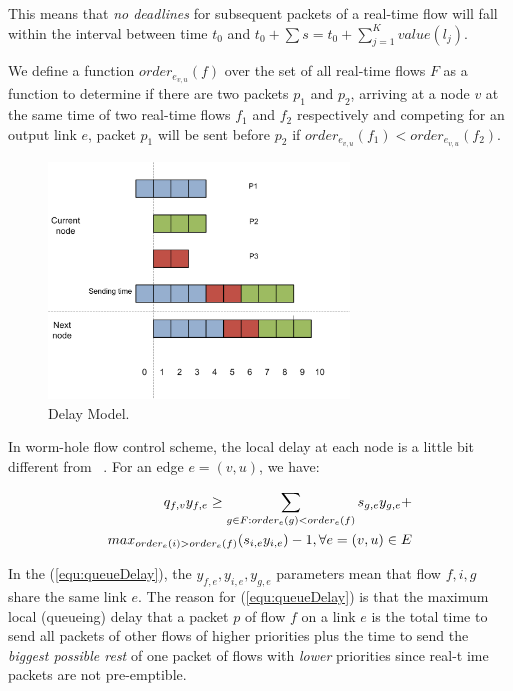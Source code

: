 \documentclass[conference, twocolumn]{IEEEtran}
\theoremstyle{definition}
\begin{document}
This means that {\em no deadlines} for subsequent packets of a real-time flow
will fall within the interval between time $t_0$ and $t_0 + \sum s = t_0 +
\sum_{j=1}^Kvalue(l_j)$.

We define a function $order_{e_{v,u}}(f)$ over the set of all real-time flows
$F$ as a function to determine if there are two packets $p_1$ and $p_2$, arriving at
a node $v$ at the same time of two real-time flows $f_1$ and $f_2$ respectively
and competing for an output link $e$, packet $p_1$ will be sent before $p_2$ if
$order_{e_{v,u}}(f_1) < order_{e_{v,u}}(f_2)$. 

\begin{figure}[htbp]
\centering
\includegraphics[width=8cm]{pics/DelayModel.png}
\caption[Delays for packets.]
{Delay Model.}\label{fig:DelayModel}
\end{figure}

In worm-hole flow control scheme, the local delay at each node is a little bit
different from ~\cite{Ferrari90ascheme}. For an edge $e = (v,u)$, we have:

\begin{eqnarray}\label{equ:queueDelay}
q_{f,v}y_{f,e} \geq \sum_{g \in F:order_{e}(g) <
order_{e}(f)}s_{g,e}y_{g,e} + \notag \\ 
max_{order_{e}(i)>order_{e}(f)}(s_{i,e}y_{i,e})-1, \forall e = (v,u)
\in E
\end{eqnarray}

In the (\ref{equ:queueDelay}), the $y_{f,e}, y_{i,e}, y_{g,e}$ parameters mean
that flow $f, i, g$ share the same link $e$. The reason for
(\ref{equ:queueDelay}) is that the maximum local (queueing) delay  that a packet
$p$ of flow $f$ on a link $e$ is the total time to send all packets of other
flows of higher priorities plus  the time  to send the {\em biggest
possible rest} of one packet of flows with {\em lower} priorities since real-t
ime packets are not pre-emptible.
\end{document}

